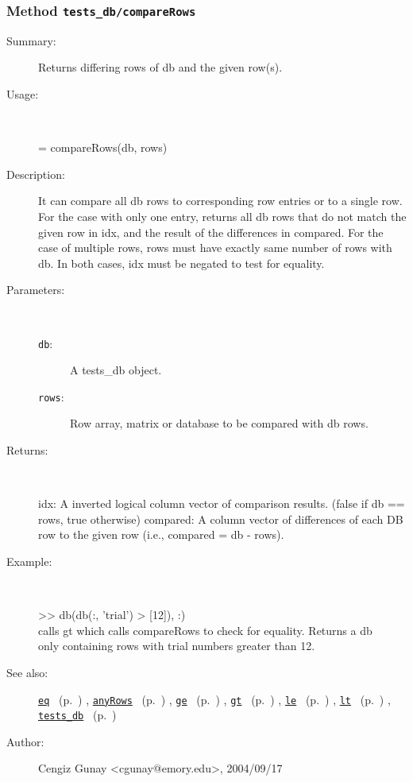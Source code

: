 \subsubsection[Method \texttt{compareRows}]{Method \texttt{tests\_db/compareRows}}%
%
\label{ref_tests_db__compareRows}%
\hypertarget{ref_tests_db__compareRows}{}%
\begin{description}
\item[Summary:]Returns differing rows of db and the given row(s).
%
\item[Usage:]~%
\begin{lyxcode}%
[idx, compared] = compareRows(db, rows)
%
\end{lyxcode}%
%
\item[Description:]%
It can compare all db rows to corresponding row entries or to a single
 row. For the case with only one entry, returns all db rows that do not
 match the given row in idx, and the result of the differences in
 compared. For the case of multiple rows, rows must have exactly same number
 of rows with db. In both cases, idx must be negated to test for equality.
\item[Parameters:]~
\begin{description}%
\item[\texttt{db}:]
 A tests\_db object.
\item[\texttt{rows}:]
 Row array, matrix or database to be compared with db rows.
\end{description}%
%
\item[Returns:
]~

	idx: A inverted logical column vector of comparison results. 
		(false if db == rows, true otherwise)
	compared: A column vector of differences of each DB row to the
 		given row (i.e., compared = db - rows).
%
\item[Example:]~
\begin{lyxcode}  >> db(db(:, 'trial') > [12]), :)
\\%
 calls gt which calls compareRows to check for equality. Returns a db
\\%
 only containing rows with trial numbers greater than 12.
\\%
\end{lyxcode}
%
\item[See also:]%
\hyperlink{ref_eq}{\texttt{eq}}%
\ (p.~\pageref{ref_eq})%
%
, \hyperlink{ref_anyRows}{\texttt{anyRows}}%
\ (p.~\pageref{ref_anyRows})%
%
, \hyperlink{ref_ge}{\texttt{ge}}%
\ (p.~\pageref{ref_ge})%
%
, \hyperlink{ref_gt}{\texttt{gt}}%
\ (p.~\pageref{ref_gt})%
%
, \hyperlink{ref_le}{\texttt{le}}%
\ (p.~\pageref{ref_le})%
%
, \hyperlink{ref_lt}{\texttt{lt}}%
\ (p.~\pageref{ref_lt})%
%
, \hyperlink{ref_tests_db}{\texttt{tests\_db}}%
\ (p.~\pageref{ref_tests_db})%
%
%
\item[Author:]%
Cengiz Gunay <cgunay@emory.edu>, 2004/09/17
%
\end{description}
\methodline%

